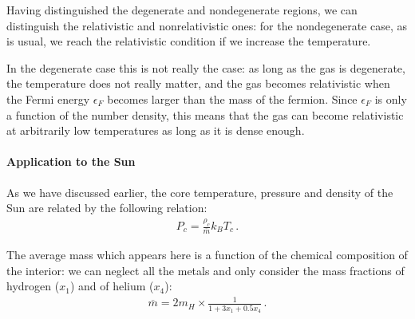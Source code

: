 \documentclass[main.tex]{subfiles}
\begin{document}
Having distinguished the degenerate and nondegenerate regions, we can distinguish the relativistic and nonrelativistic ones: for the nondegenerate case, as is usual, we reach the relativistic condition if we increase the temperature. 

In the degenerate case this is not really the case: as long as the gas is degenerate, the temperature does not really matter, and the gas becomes relativistic when the Fermi energy \(\epsilon _F\) becomes larger than the mass of the fermion.
Since \(\epsilon _F\) is only a function of the number density, this means that the gas can become relativistic at arbitrarily low temperatures as long as it is dense enough.




\paragraph{Application to the Sun}

As we have discussed earlier, the core temperature, pressure and density of the Sun are related by the following relation:
%
\begin{align}
  P_c = \frac{\rho _c}{\overline{m}} k_B T_c
\,.
\end{align}

The average mass which appears here is a function of the chemical composition of the interior: we can neglect all the metals and only consider the mass fractions of hydrogen (\(x_1 \)) and of helium (\(x_4 \)): 
%
\begin{align}
  \overline{m} = 2 m_H \times \frac{1}{1 + 3x_1 + 0.5 x_4}
\,.
\end{align}
%
\end{document}
